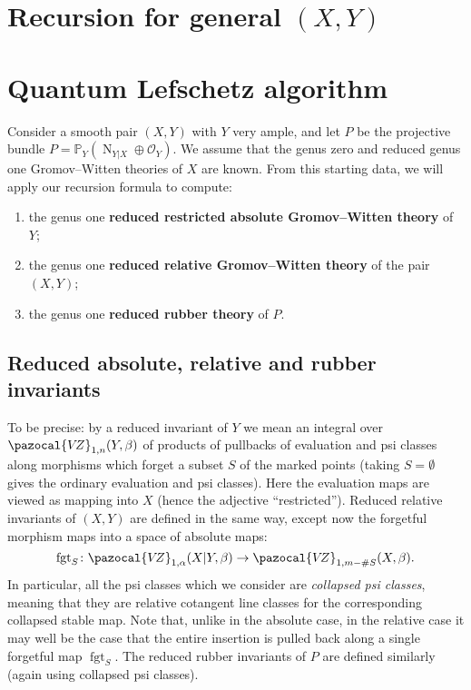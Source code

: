 \documentclass[11pt]{amsart}
\newcommand{\PP}{\mathbb P}
\newcommand{\VZ}{\pazocal{V\!Z}}
\newcommand{\OO}{\mathcal{O}}
\renewcommand{\to}{\rightarrow}
\newcommand{\fgt}{\operatorname{fgt}}
\theoremstyle{definition}
\theoremstyle{definition}
\begin{document}
\section{Recursion for general $(X,Y)$}

\section{Quantum Lefschetz algorithm}\label{section recursion algorithm}
Consider a smooth pair $(X,Y)$ with $Y$ very ample, and let $P$ be the projective bundle $P=\PP_Y(\operatorname{N}_{Y|X} \oplus\OO_Y)$. We assume that the genus zero and reduced genus one Gromov--Witten theories of $X$ are known. From this starting data, we will apply our recursion formula to compute:
\begin{enumerate}
\item the genus one \textbf{reduced restricted absolute Gromov--Witten theory} of $Y$;
\item the genus one \textbf{reduced relative Gromov--Witten theory} of the pair $(X,Y)$;
\item the genus one \textbf{reduced rubber theory} of $P$.
\end{enumerate}

\subsection{Reduced absolute, relative and rubber invariants} To be precise: by a reduced invariant of $Y$ we mean an integral over $\VZ_{1,n}(Y,\beta)$ of products of pullbacks of evaluation and psi classes along morphisms which forget a subset $S$ of the marked points (taking $S=\emptyset$ gives the ordinary evaluation and psi classes). Here the evaluation maps are viewed as mapping into $X$ (hence the adjective ``restricted''). Reduced relative invariants of $(X,Y)$ are defined in the same way, except now the forgetful morphism maps into a space of absolute maps:
\begin{equation*} \fgt_S \colon \VZ_{1,\alpha}(X|Y,\beta) \to \VZ_{1,m-\#S}(X,\beta).\end{equation*}
In particular, all the psi classes which we consider are \emph{collapsed psi classes}, meaning that they are relative cotangent line classes for the corresponding collapsed stable map. Note that, unlike in the absolute case, in the relative case it may well be the case that the entire insertion is pulled back along a single forgetful map $\fgt_S$. The reduced rubber invariants of $P$ are defined similarly (again using collapsed psi classes).
\end{document}
